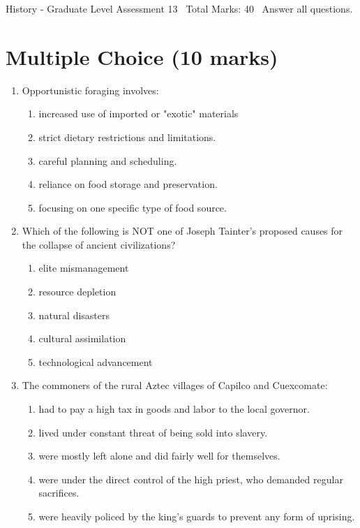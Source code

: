 \documentclass[12pt]{article}
\begin{document}
\begin{center}
History - Graduate Level Assessment 13 \
Total Marks: 40 \
Answer all questions.
\end{center}

\section*{Multiple Choice (10 marks)}
\begin{enumerate}[label=\arabic*.]
\item Opportunistic foraging involves:
\begin{enumerate}[label=(\alph*)]
    \item increased use of imported or "exotic" materials
    \item strict dietary restrictions and limitations.
    \item careful planning and scheduling.
    \item reliance on food storage and preservation.
    \item focusing on one specific type of food source.
\end{enumerate}
\item Which of the following is NOT one of Joseph Tainter's proposed causes for the collapse of ancient civilizations?
\begin{enumerate}[label=(\alph*)]
    \item elite mismanagement
    \item resource depletion
    \item natural disasters
    \item cultural assimilation
    \item technological advancement
\end{enumerate}
\item The commoners of the rural Aztec villages of Capilco and Cuexcomate:
\begin{enumerate}[label=(\alph*)]
    \item had to pay a high tax in goods and labor to the local governor.
    \item lived under constant threat of being sold into slavery.
    \item were mostly left alone and did fairly well for themselves.
    \item were under the direct control of the high priest, who demanded regular sacrifices.
    \item were heavily policed by the king's guards to prevent any form of uprising.
\end{enumerate}

\end{enumerate}
\end{document}
